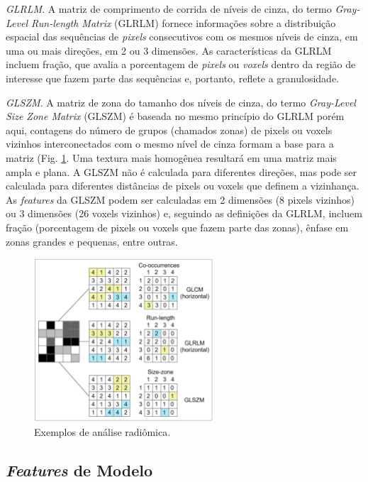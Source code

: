  \textit{GLRLM}. A matriz de comprimento de corrida de níveis de cinza, do termo 
 \textit{Gray-Level Run-length Matrix} (GLRLM) fornece informações sobre a distribuição espacial das sequências de \textit{pixels} consecutivos com os mesmos níveis de cinza, em uma ou mais direções, em 2 ou 3 dimensões. As características da GLRLM incluem fração, que avalia a porcentagem de \textit{pixels} ou \textit{voxels} dentro da região de interesse que fazem parte das sequências e, portanto, reflete a granulosidade. 

\textit{GLSZM}. A matriz de zona do tamanho dos níveis de cinza, do termo \textit{Gray-Level Size Zone Matrix} (GLSZM) é baseada no mesmo princípio do GLRLM porém aqui, contagens do número de grupos (chamados zonas) de pixels ou voxels vizinhos interconectados com o mesmo nível de cinza formam a base para a matriz (Fig. \ref{fig:fig002}. Uma textura mais homogênea resultará em uma matriz mais ampla e plana. A GLSZM não é calculada para diferentes direções, mas pode ser calculada para diferentes distâncias de pixels ou voxels que definem a vizinhança. As \textit{features} da GLSZM podem ser calculadas em 2 dimensões (8 pixels vizinhos) ou 3 dimensões (26 voxels vizinhos) e, seguindo as definições da GLRLM, incluem fração (porcentagem de pixels ou voxels que fazem parte das zonas), ênfase em zonas grandes e pequenas, entre outras.

\begin{figure}[htbp]
    \centering
    \includegraphics[width=0.6\textwidth]{figures/fig002.png}
    \caption{Exemplos de análise radiômica.}
    \label{fig:fig002}
\end{figure}

\subsection{\textit{Features} de Modelo}

